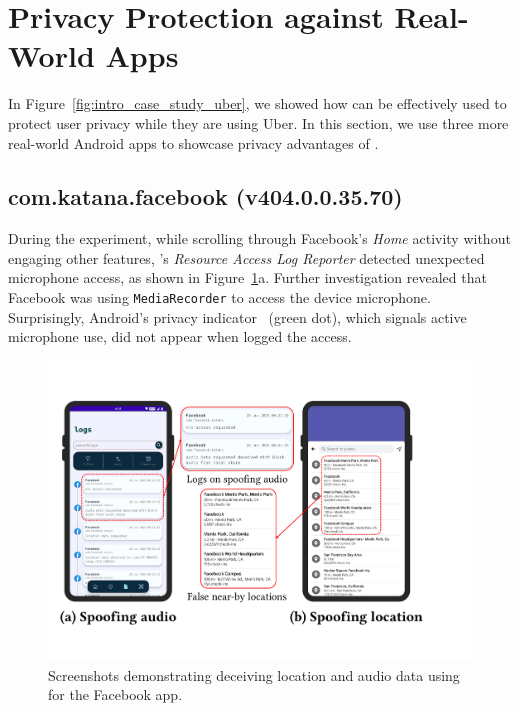 \section{Privacy Protection against Real-World Apps}
\label{sec:protecting_up}

In Figure~\ref{fig:intro_case_study_uber}, we showed how \framework{} can be effectively used to protect user privacy while they are using Uber. In this section, we use three more real-world Android apps to showcase privacy advantages of \framework{}.

\subsection{com.katana.facebook (v404.0.0.35.70)}
\label{sec:fb_case_study}
 
During the experiment, while scrolling through Facebook’s \textit{Home} activity without engaging other features, \framework{}'s \textit{Resource Access Log Reporter} detected unexpected microphone access, as shown in Figure~\ref{fig:case-study-facebook}a. Further investigation revealed that Facebook was using \texttt{MediaRecorder} to access the device microphone. Surprisingly, Android’s privacy indicator~\cite{andPrivacyIndicator} (green dot), which signals active microphone use, did not appear when \framework{} logged the access.

\vspace{-15pt}
\begin{figure}
    \centering
    \includegraphics[width=0.75\linewidth]{Figures/Case Studies/facebook_screenshots.pdf}
    \caption{Screenshots demonstrating deceiving location and audio data using \framework{} for the Facebook app.}
    \label{fig:case-study-facebook}
\end{figure}
\vspace{-12pt}

